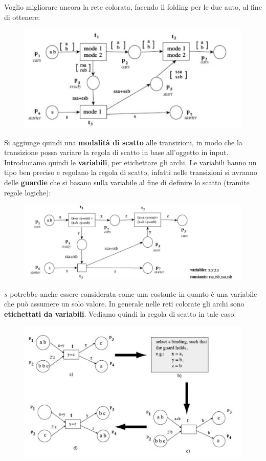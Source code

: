 \documentclass[a4paper,12pt, oneside]{book}
\begin{document}
\begin{esempio}
  Voglio migliorare ancora la rete colorata, facendo il folding per le due auto,
  al fine di ottenere:
  \begin{figure}[H]
    \centering
    \includegraphics[scale = 0.7]{img/c12.jpg}
  \end{figure}
  Si aggiunge quindi una \textbf{modalità di scatto} alle transizioni, in modo
  che la transizione possa variare la regola di scatto in base all'oggetto in
  input.
  \newpage
  Introduciamo quindi le \textbf{variabili}, per etichettare gli archi. Le
  variabili hanno un tipo ben preciso e regolano la regola di scatto, infatti
  nelle transizioni si avranno delle \textbf{guardie} che si basano sulla
  variabile al fine di definire lo scatto (tramite regole logiche):
  \begin{figure}[H]
    \centering
    \includegraphics[scale = 0.5]{img/c15.jpg}
  \end{figure}
  $s$ potrebbe anche essere considerata come una costante in quanto è una
  variabile che può assumere un solo valore. In generale nelle reti colorate gli
  archi sono \textbf{etichettati da variabili}. Vediamo quindi la regola di
  scatto in tale caso:
  \begin{figure}[H]
    \centering
    \includegraphics[scale = 0.7]{img/c16.jpg}

\end{figure}
\end{esempio}
\end{document}
